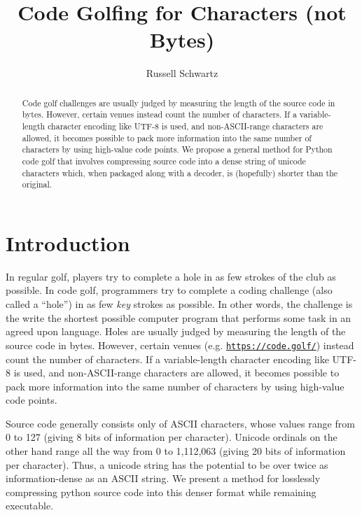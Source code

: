 \documentclass{article}
\title{Code Golfing for Characters (not Bytes)}
\author{Russell Schwartz}
\begin{document}
\maketitle

\begin{abstract}
    Code golf challenges are usually judged by measuring the length of the source code in bytes. However, certain venues instead count the number of characters. If a variable-length character encoding like UTF-8 is used, and non-ASCII-range characters are allowed, it becomes possible to pack more information into the same number of characters by using high-value code points. We propose a general method for Python code golf that involves compressing source code into a dense string of unicode characters which, when packaged along with a decoder, is (hopefully) shorter than the original.
\end{abstract}


\section*{Introduction}
In regular golf, players try to complete a hole in as few strokes of the club as possible. In code golf, programmers try to complete a coding challenge (also called a ``hole'') in as few \emph{key} strokes as possible. In other words, the challenge is the write the shortest possible computer program that performs some task in an agreed upon language. Holes are usually judged by measuring the length of the source code in bytes. However, certain venues (e.g. \href{https://code.golf/}{\texttt{https://code.golf/}}) instead count the number of characters. If a variable-length character encoding like UTF-8 is used, and non-ASCII-range characters are allowed, it becomes possible to pack more information into the same number of characters by using high-value code points. 

\medskip

Source code generally consists only of ASCII characters, whose values range from \textsf{0} to \textsf{127} (giving 8 bits of information per character). Unicode ordinals on the other hand range all the way from \textsf{0} to \textsf{1,112,063} (giving 20 bits of information per character). Thus, a unicode string has the potential to be over twice as information-dense as an ASCII string. We present a method for losslessly compressing python source code into this denser format while remaining executable.
\end{document}
